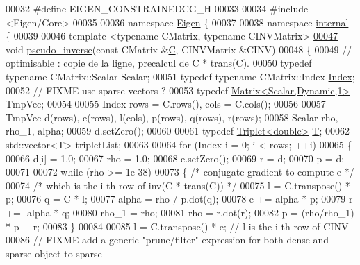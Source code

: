 \begin{DoxyCode}
00032 \textcolor{preprocessor}{#define EIGEN\_CONSTRAINEDCG\_H}
00033 
00034 \textcolor{preprocessor}{#include <Eigen/Core>}
00035 
00036 \textcolor{keyword}{namespace }\hyperlink{namespace_eigen}{Eigen} \{ 
00037 
00038 \textcolor{keyword}{namespace }\hyperlink{namespaceinternal}{internal} \{
00039 
00046 \textcolor{keyword}{template} <\textcolor{keyword}{typename} CMatrix, \textcolor{keyword}{typename} CINVMatrix>
\hyperlink{namespace_eigen_1_1internal_a58a0ccf0e71d88beeb5dcf72ed0bdd5f}{00047} \textcolor{keywordtype}{void} \hyperlink{namespace_eigen_1_1internal_a58a0ccf0e71d88beeb5dcf72ed0bdd5f}{pseudo\_inverse}(\textcolor{keyword}{const} CMatrix &\hyperlink{group___core___module_class_eigen_1_1_matrix}{C}, CINVMatrix &CINV)
00048 \{
00049   \textcolor{comment}{// optimisable : copie de la ligne, precalcul de C * trans(C).}
00050   \textcolor{keyword}{typedef} \textcolor{keyword}{typename} CMatrix::Scalar Scalar;
00051   \textcolor{keyword}{typedef} \textcolor{keyword}{typename} CMatrix::Index \hyperlink{namespace_eigen_a62e77e0933482dafde8fe197d9a2cfde}{Index};
00052   \textcolor{comment}{// FIXME use sparse vectors ?}
00053   \textcolor{keyword}{typedef} \hyperlink{group___core___module}{Matrix<Scalar,Dynamic,1>} TmpVec;
00054 
00055   Index rows = C.rows(), cols = C.cols();
00056 
00057   TmpVec d(rows), e(rows), l(cols), p(rows), q(rows), r(rows);
00058   Scalar rho, rho\_1, alpha;
00059   d.setZero();
00060 
00061   \textcolor{keyword}{typedef} \hyperlink{group___sparse_core___module}{Triplet<double>} \hyperlink{group___sparse_core___module}{T};
00062   std::vector<T> tripletList;
00063     
00064   \textcolor{keywordflow}{for} (Index i = 0; i < rows; ++i)
00065   \{
00066     d[i] = 1.0;
00067     rho = 1.0;
00068     e.setZero();
00069     r = d;
00070     p = d;
00071 
00072     \textcolor{keywordflow}{while} (rho >= 1e-38)
00073     \{ \textcolor{comment}{/* conjugate gradient to compute e             */}
00074       \textcolor{comment}{/* which is the i-th row of inv(C * trans(C))  */}
00075       l = C.transpose() * p;
00076       q = C * l;
00077       alpha = rho / p.dot(q);
00078       e +=  alpha * p;
00079       r += -alpha * q;
00080       rho\_1 = rho;
00081       rho = r.dot(r);
00082       p = (rho/rho\_1) * p + r;
00083     \}
00084 
00085     l = C.transpose() * e; \textcolor{comment}{// l is the i-th row of CINV}
00086     \textcolor{comment}{// FIXME add a generic "prune/filter" expression for both dense and sparse object to sparse}

\end{DoxyCode}
